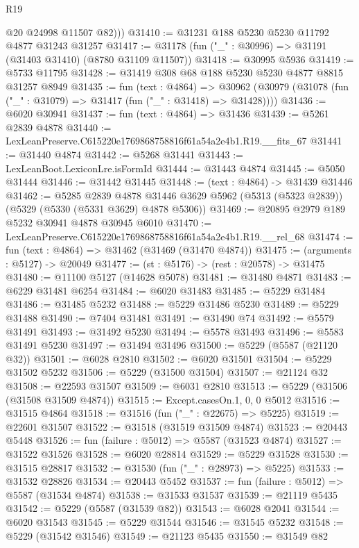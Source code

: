 \begin{lexlean}{R19}
\begin{coremodule}
          @20
          @24998
          @11507
          @82)))
@31410 := @31231 @188 @5230 @5230 @11792 @4877 @31243 @31257
@31417 := @31178 (fun ("_" : @30996) => @31191 (@31403 @31410) (@8780 @31109 @11507))
@31418 := @30995 @5936
@31419 := @5733 @11795
@31428 := @31419 @308 @68 @188 @5230 @5230 @4877 @8815 @31257 @8949
@31435 := fun (text : @4864) =>
  @30962 (@30979 (@31078 (fun ("_" : @31079) => @31417 (fun ("_" : @31418) => @31428))))
@31436 := @6020 @30941
@31437 := fun (text : @4864) => @31436
@31439 := @5261 @2839 @4878
@31440 := LexLeanPreserve.C615220e1769868758816f61a54a2e4b1.R19.__fits_67
@31441 := @31440 @4874
@31442 := @5268 @31441
@31443 := LexLeanBoot.LexiconLre.isFormId
@31444 := @31443 @4874
@31445 := @5050 @31444
@31446 := @31442 @31445
@31448 := (text : @4864) -> @31439 @31446
@31462 := @5285
    @2839
    @4878
    @31446
    @3629
    @5962
    (@5313 (@5323 @2839))
    (@5329 (@5330 (@5331 @3629) @4878 @5306))
@31469 := @20895 @2979 @189 @5232 @30941 @4878 @30945 @6010
@31470 := LexLeanPreserve.C615220e1769868758816f61a54a2e4b1.R19.__rel_68
@31474 := fun (text : @4864) => @31462 (@31469 (@31470 @4874))
@31475 := (arguments : @5127) -> @20049
@31477 := (st : @5176) -> (rest : @20578) -> @31475
@31480 := @11100 @5127 (@14628 @5078)
@31481 := @31480 @4871
@31483 := @6229 @31481 @6254
@31484 := @6020 @31483
@31485 := @5229 @31484
@31486 := @31485 @5232
@31488 := @5229 @31486 @5230
@31489 := @5229 @31488
@31490 := @7404 @31481
@31491 := @31490 @74
@31492 := @5579 @31491
@31493 := @31492 @5230
@31494 := @5578 @31493
@31496 := @5583 @31491 @5230
@31497 := @31494 @31496
@31500 := @5229 (@5587 (@21120 @32))
@31501 := @6028 @2810
@31502 := @6020 @31501
@31504 := @5229 @31502 @5232
@31506 := @5229 (@31500 @31504)
@31507 := @21124 @32
@31508 := @22593 @31507
@31509 := @6031 @2810
@31513 := @5229 (@31506 (@31508 @31509 @4874))
@31515 := Except.casesOn.{1, 0, 0} @5012
@31516 := @31515 @4864
@31518 := @31516 (fun ("_" : @22675) => @5225)
@31519 := @22601 @31507
@31522 := @31518 (@31519 @31509 @4874)
@31523 := @20443 @5448
@31526 := fun (failure : @5012) => @5587 (@31523 @4874)
@31527 := @31522 @31526
@31528 := @6020 @28814
@31529 := @5229 @31528
@31530 := @31515 @28817
@31532 := @31530 (fun ("_" : @28973) => @5225)
@31533 := @31532 @28826
@31534 := @20443 @5452
@31537 := fun (failure : @5012) => @5587 (@31534 @4874)
@31538 := @31533 @31537
@31539 := @21119 @5435
@31542 := @5229 (@5587 (@31539 @82))
@31543 := @6028 @2041
@31544 := @6020 @31543
@31545 := @5229 @31544
@31546 := @31545 @5232
@31548 := @5229 (@31542 @31546)
@31549 := @21123 @5435
@31550 := @31549 @82

\end{coremodule}
\end{lexlean}
